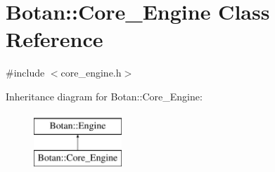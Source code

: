 \hypertarget{classBotan_1_1Core__Engine}{\section{Botan\-:\-:Core\-\_\-\-Engine Class Reference}
\label{classBotan_1_1Core__Engine}
}


{\ttfamily \#include $<$core\-\_\-engine.\-h$>$}

Inheritance diagram for Botan\-:\-:Core\-\_\-\-Engine\-:\begin{figure}[H]
\begin{center}
\leavevmode
\includegraphics[height=2.000000cm]{classBotan_1_1Core__Engine}
\end{center}
\end{figure}
